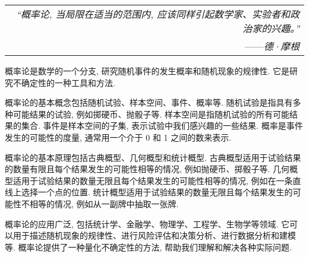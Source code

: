 \begin{flushright}
    \begin{tabular}{r|||}
        \textit{“概率论, 当局限在适当的范围内, 应该同样引起数学家、实验者和政治家的兴趣。”}\\
        ——\textit{德·摩根}
    \end{tabular}
\end{flushright}

概率论是数学的一个分支, 研究随机事件的发生概率和随机现象的规律性. 它是研究不确定性的一种工具和方法. 

概率论的基本概念包括随机试验、样本空间、事件、概率等. 随机试验是指具有多种可能结果的试验, 例如掷硬币、抛骰子等. 样本空间是指随机试验的所有可能结果的集合. 事件是样本空间的子集, 表示试验中我们感兴趣的一些结果. 概率是事件发生的可能性的度量, 通常用一个介于 0 和 1 之间的数来表示. 

概率论的基本原理包括古典概型、几何概型和统计概型. 古典概型适用于试验结果的数量有限且每个结果发生的可能性相等的情况, 例如抛硬币、掷骰子等. 几何概型适用于试验结果的数量无限且每个结果发生的可能性相等的情况, 例如在一条直线上选择一个点的位置. 统计概型适用于试验结果的数量无限且每个结果发生的可能性不相等的情况, 例如从一副牌中抽取一张牌. 

概率论的应用广泛, 包括统计学、金融学、物理学、工程学、生物学等领域. 它可以用于描述随机现象的规律性、进行风险评估和决策分析、进行数据分析和建模等. 概率论提供了一种量化不确定性的方法, 帮助我们理解和解决各种实际问题. 